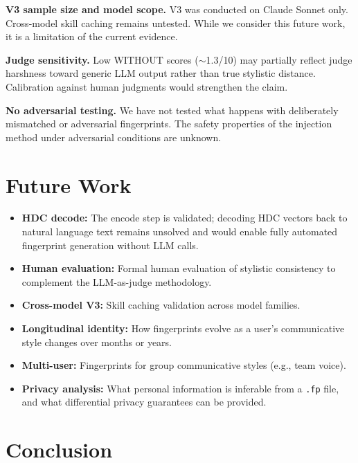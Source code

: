 \documentclass[11pt,a4paper]{article}
\begin{document}
\textbf{V3 sample size and model scope.} V3 was conducted on Claude Sonnet only. Cross-model skill caching remains untested. While we consider this future work, it is a limitation of the current evidence.

\textbf{Judge sensitivity.} Low WITHOUT scores ($\sim$1.3/10) may partially reflect judge harshness toward generic LLM output rather than true stylistic distance. Calibration against human judgments would strengthen the claim.

\textbf{No adversarial testing.} We have not tested what happens with deliberately mismatched or adversarial fingerprints. The safety properties of the injection method under adversarial conditions are unknown.

\section{Future Work}

\begin{itemize}[nosep]
  \item \textbf{HDC decode:} The encode step is validated; decoding HDC vectors back to natural language text remains unsolved and would enable fully automated fingerprint generation without LLM calls.
  \item \textbf{Human evaluation:} Formal human evaluation of stylistic consistency to complement the LLM-as-judge methodology.
  \item \textbf{Cross-model V3:} Skill caching validation across model families.
  \item \textbf{Longitudinal identity:} How fingerprints evolve as a user's communicative style changes over months or years.
  \item \textbf{Multi-user:} Fingerprints for group communicative styles (e.g., team voice).
  \item \textbf{Privacy analysis:} What personal information is inferable from a \texttt{.fp} file, and what differential privacy guarantees can be provided.
\end{itemize}

\section{Conclusion}
\end{document}
